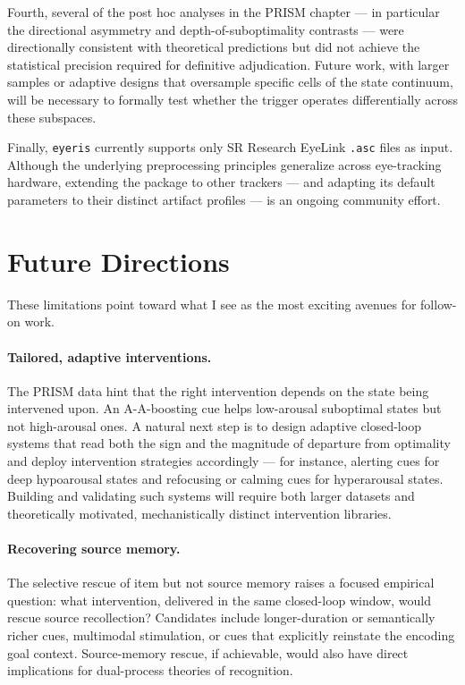 Fourth, several of the post hoc analyses in the PRISM chapter --- in particular the directional asymmetry and depth-of-suboptimality contrasts --- were directionally consistent with theoretical predictions but did not achieve the statistical precision required for definitive adjudication. Future work, with larger samples or adaptive designs that oversample specific cells of the state continuum, will be necessary to formally test whether the trigger operates differentially across these subspaces.

Finally, \texttt{eyeris} currently supports only SR Research EyeLink \texttt{.asc} files as input. Although the underlying preprocessing principles generalize across eye-tracking hardware, extending the package to other trackers --- and adapting its default parameters to their distinct artifact profiles --- is an ongoing community effort.

\section{Future Directions}

These limitations point toward what I see as the most exciting avenues for follow-on work.

\paragraph{Tailored, adaptive interventions.} The PRISM data hint that the right intervention depends on the state being intervened upon. An A-A-boosting cue helps low-arousal suboptimal states but not high-arousal ones. A natural next step is to design adaptive closed-loop systems that read both the sign and the magnitude of departure from optimality and deploy intervention strategies accordingly --- for instance, alerting cues for deep hypoarousal states and refocusing or calming cues for hyperarousal states. Building and validating such systems will require both larger datasets and theoretically motivated, mechanistically distinct intervention libraries.

\paragraph{Recovering source memory.} The selective rescue of item but not source memory raises a focused empirical question: what intervention, delivered in the same closed-loop window, would rescue source recollection? Candidates include longer-duration or semantically richer cues, multimodal stimulation, or cues that explicitly reinstate the encoding goal context. Source-memory rescue, if achievable, would also have direct implications for dual-process theories of recognition.

